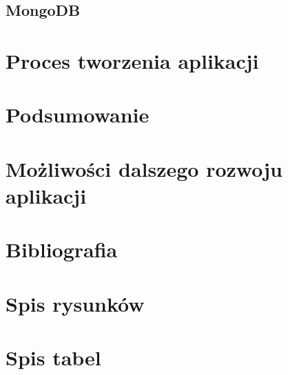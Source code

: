\documentclass[12pt]{article}
\begin{document}
\begin{sloppypar}
{{}
\subsection{MongoDB}
{

}
}

\section{Proces tworzenia aplikacji}
{

}

\section{Podsumowanie}
{

}

\section{Możliwości dalszego rozwoju aplikacji}
{

}

\section{Bibliografia}
{
  \printbibliography
}

\section{Spis rysunków}
{
  \listoffigures
}

\section{Spis tabel}
{
  \listoftables
}

\end{sloppypar}
\end{document}

